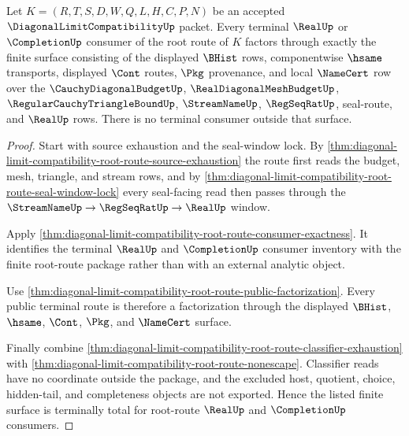 \begin{theorem}
\label{thm:diagonal-limit-compatibility-root-route-totality}
Let $K=(R,T,S,D,W,Q,L,H,C,P,N)$ be an accepted $\DiagonalLimitCompatibilityUp$ packet. Every terminal $\RealUp$ or $\CompletionUp$ consumer of the root route of $K$ factors through exactly the finite surface consisting of the displayed $\BHist$ rows, componentwise $\hsame$ transports, displayed $\Cont$ routes, $\Pkg$ provenance, and local $\NameCert$ row over the $\CauchyDiagonalBudgetUp$, $\RealDiagonalMeshBudgetUp$, $\RegularCauchyTriangleBoundUp$, $\StreamNameUp$, $\RegSeqRatUp$, seal-route, and $\RealUp$ rows. There is no terminal consumer outside that surface.
\end{theorem}
\begin{proof}
Start with source exhaustion and the seal-window lock. By \autoref{thm:diagonal-limit-compatibility-root-route-source-exhaustion} the route first reads the budget, mesh, triangle, and stream rows, and by \autoref{thm:diagonal-limit-compatibility-root-route-seal-window-lock} every seal-facing read then passes through the $\StreamNameUp \to \RegSeqRatUp \to \RealUp$ window.

Apply \autoref{thm:diagonal-limit-compatibility-root-route-consumer-exactness}. It identifies the terminal $\RealUp$ and $\CompletionUp$ consumer inventory with the finite root-route package rather than with an external analytic object.

Use \autoref{thm:diagonal-limit-compatibility-root-route-public-factorization}. Every public terminal route is therefore a factorization through the displayed $\BHist$, $\hsame$, $\Cont$, $\Pkg$, and $\NameCert$ surface.

Finally combine \autoref{thm:diagonal-limit-compatibility-root-route-classifier-exhaustion} with \autoref{thm:diagonal-limit-compatibility-root-route-nonescape}. Classifier reads have no coordinate outside the package, and the excluded host, quotient, choice, hidden-tail, and completeness objects are not exported. Hence the listed finite surface is terminally total for root-route $\RealUp$ and $\CompletionUp$ consumers.
\end{proof}

